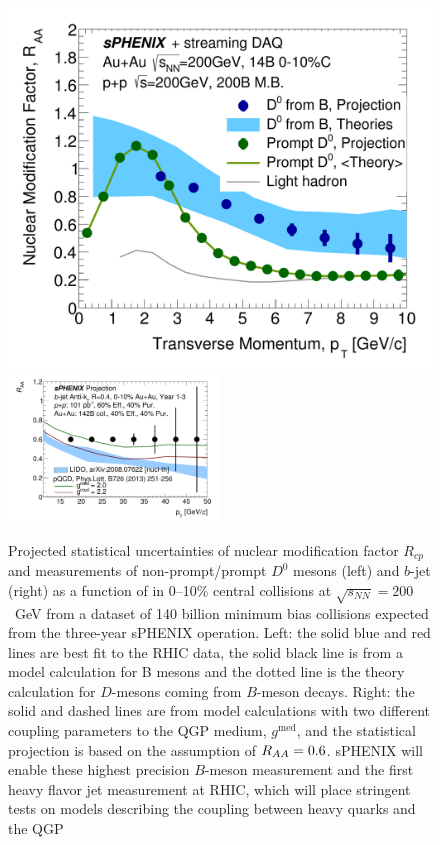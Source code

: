 \begin{figure}[htbp]
\centering
\includegraphics[width=.49\linewidth]{figs/RAA_DB_theory_root_RAADB_pp200B.pdf}
\includegraphics[width=0.5\textwidth]{figs/200pp_pythia8_CTEQ6L_7GeV_ALL_cfg_eneg_DSTReader_root_Draw_HFJetTruth_CrossSection2RAA_Theory_3yr_deta0_70.pdf}
\caption{Projected statistical uncertainties of nuclear modification factor $R_{cp}$ and \raa measurements of non-prompt/prompt $D^0$ mesons (left) and $b$-jet (right) as a function of \pT in 0--10\% central \auau collisions at $\sqrt{s_{NN}}=200$~GeV from a dataset of 140 billion minimum bias \auau collisions expected from the three-year sPHENIX operation. Left: the solid blue and red lines are best fit to the RHIC data, the solid black line is from a model calculation for B mesons and the dotted line is the theory calculation for $D$-mesons coming from $B$-meson decays. Right: the solid and dashed lines are from model calculations with two different coupling parameters to the QGP medium, $g^{\textrm{med}}$, and the statistical projection is based on the assumption of $\mbox{$R_{AA}$} =0.6$. sPHENIX will enable these highest precision $B$-meson measurement and the first heavy flavor jet measurement at RHIC, which will place stringent tests on models describing the coupling between heavy quarks and the QGP~\cite{Huang:2013vaa,Duke,TAMU,PHSD,CUJET}}
\label{fig:HF-inclusive-RAA}
\end{figure}

